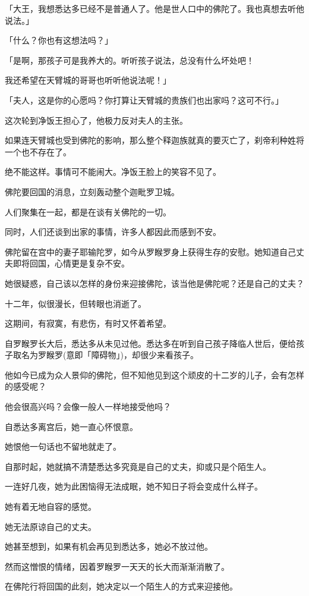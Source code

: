 \documentclass[twoside,openany]{book}
\begin{document}
「大王，我想悉达多已经不是普通人了。他是世人口中的佛陀了。我也真想去听他说法。」

「什么？你也有这想法吗？」

「是啊，那孩子可是我养大的。听听孩子说法，总没有什么坏处吧！

我还希望在天臂城的哥哥也听听他说法呢！」

「夫人，这是你的心愿吗？你打算让天臂城的贵族们也出家吗？这可不行。」

这次轮到净饭王担心了，他极力反对夫人的主张。

如果连天臂城也受到佛陀的影响，那么整个释迦族就真的要灭亡了，刹帝利种姓将一个也不存在了。

绝不能这样。事情可不能闹大。净饭王脸上的笑容不见了。

佛陀要回国的消息，立刻轰动整个迦毗罗卫城。

人们聚集在一起，都是在谈有关佛陀的一切。

同时，人们还谈到出家的事情，许多人都因此而感到不安。

佛陀留在宫中的妻子耶输陀罗，如今从罗睺罗身上获得生存的安慰。她知道自己丈夫即将回国，心情更是复杂不安。

她很疑惑，自己该以怎样的身份来迎接佛陀，该当他是佛陀呢？还是自己的丈夫？

十二年，似很漫长，但转眼也消逝了。

这期间，有寂寞，有悲伤，有时又怀着希望。

自罗睺罗长大后，悉达多从未见过他。悉达多在听到自己孩子降临人世后，便给孩子取名为罗睺罗(意即「障碍物」)，却很少来看孩子。

他如今已成为众人景仰的佛陀，但不知他见到这个顽皮的十二岁的儿子，会有怎样的感受呢？

他会很高兴吗？会像一般人一样地接受他吗？

自悉达多离宫后，她一直心怀恨意。

她恨他一句话也不留地就走了。

自那时起，她就搞不清楚悉达多究竟是自己的丈夫，抑或只是个陌生人。

一连好几夜，她为此困恼得无法成眠，她不知日子将会变成什么样子。

她有着无地自容的感觉。

她无法原谅自己的丈夫。

她甚至想到，如果有机会再见到悉达多，她必不放过他。

然而这憎恨的情绪，因着罗睺罗一天天的长大而渐渐消散了。

在佛陀行将回国的此刻，她决定以一个陌生人的方式来迎接他。
\end{document}
